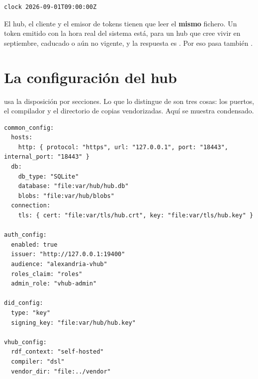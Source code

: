 \begin{lstlisting}[style=sh]
clock 2026-09-01T09:00:00Z
\end{lstlisting}

\begin{trampaHabitual}
El hub, el cliente y el emisor de tokens tienen que leer el \textbf{mismo} fichero. Un token emitido con la hora
real del sistema está, para un hub que cree vivir en septiembre, caducado o aún no vigente, y la respuesta es
. Por eso  pasa también .
\end{trampaHabitual}

\section{La configuración del hub}

 usa la disposición por secciones. Lo que lo distingue de  son tres
cosas: los puertos, el compilador y el directorio de copias vendorizadas. Aquí se muestra condensado.

\begin{lstlisting}[style=yaml]
common_config:
  hosts:
    http: { protocol: "https", url: "127.0.0.1", port: "18443", internal_port: "18443" }
  db:
    db_type: "SQLite"
    database: "file:var/hub/hub.db"
    blobs: "file:var/hub/blobs"
  connection:
    tls: { cert: "file:var/tls/hub.crt", key: "file:var/tls/hub.key" }

auth_config:
  enabled: true
  issuer: "http://127.0.0.1:19400"
  audience: "alexandria-vhub"
  roles_claim: "roles"
  admin_role: "vhub-admin"

did_config:
  type: "key"
  signing_key: "file:var/hub/hub.key"

vhub_config:
  rdf_context: "self-hosted"
  compiler: "dsl"
  vendor_dir: "file:../vendor"
\end{lstlisting}

